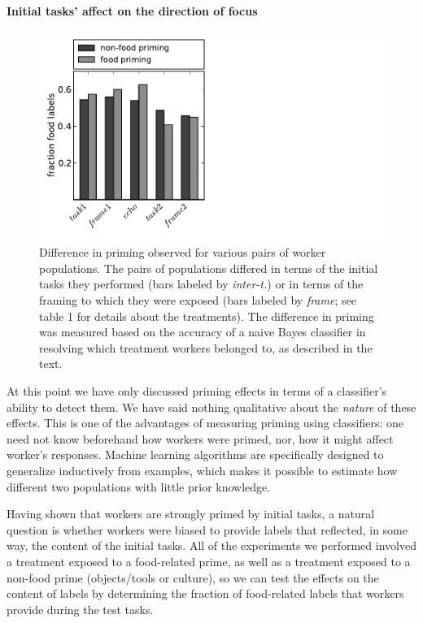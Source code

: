 \documentclass[12pt]{article}
\begin{document}
\paragraph{Initial tasks' affect on the direction of focus} 
\begin{figure}
	\centering
	\includegraphics[scale=1]{figs/food_specificity.pdf}
	\caption{
		Difference in priming observed for various pairs of worker populations.
		The pairs of populations differed in terms of the initial tasks they
		performed (bars labeled by \textit{inter-t.}) or in terms of the framing
		to which they were exposed (bars labeled by \textit{frame}; see table 1 for
		details about the treatments).  The difference in priming was 
		measured based on the accuracy of a naive Bayes classifier in 
		resolving which treatment workers belonged to, as described in the 
		text.  
	}
	\label{fig:food_specificity}
\end{figure}

At this point we have only discussed priming effects in terms of a 
classifier's ability to detect them.
We have said nothing qualitative about the \textit{nature} of these effects.  
This is one of the advantages of measuring priming using classifiers: one need 
not know beforehand how workers were primed, nor, 
how it might affect worker's responses.  Machine learning algorithms are
specifically designed to generalize inductively from examples, which makes
it possible to estimate how different two populations with little prior 
knowledge.

Having shown that workers are strongly primed by initial tasks, a natural
question is whether workers were biased to provide labels that reflected, 
in some way, the content of the initial tasks.  All of the experiments 
we performed involved a treatment exposed to a food-related prime, as well
as a treatment exposed to a non-food prime (objects/tools or culture), so
we can test the effects on the content of labels by determining the fraction
of food-related labels that workers provide during the test tasks.
\end{document}
